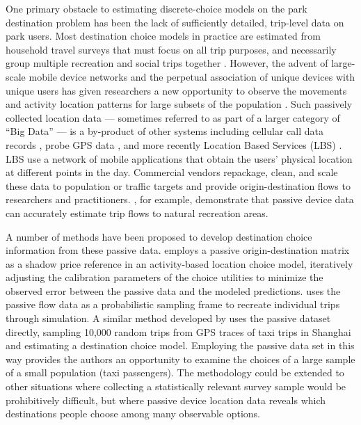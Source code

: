 \documentclass[3p, authoryear, review]{elsarticle} %
\begin{document}
One primary obstacle to estimating discrete-choice models on the park
destination problem has been the lack of sufficiently detailed, trip-level data
on park users. Most destination choice models in practice are estimated from
household travel surveys that must focus on all trip purposes, and necessarily
group multiple recreation and social trips together \citep{nchrp716}. However, the
advent of large-scale mobile device networks and the perpetual association of
unique devices with unique users has given researchers a new opportunity to
observe the movements and activity location patterns for large subsets of the
population \citep{Naboulsi2016}. Such passively collected location data --- sometimes
referred to as part of a larger category of ``Big Data'' --- is a by-product of other
systems including cellular call data records \citep[e.g.,][]{Bolla2000, Calabrese2011}, probe GPS data \citep{Huang2015}, and more recently Location Based
Services (LBS) \citep{Roll2019, Komanduri2017}. LBS use a network of mobile
applications that obtain the users' physical location at different points in the
day. Commercial vendors repackage, clean, and scale these data to population or
traffic targets and provide origin-destination flows to researchers and
practitioners. \citet{Monz2019}, for example, demonstrate that passive device data can
accurately estimate trip flows to natural recreation areas.

A number of methods have been proposed to develop destination choice
information from these passive data. \citet{Bernardin2018} employs a passive
origin-destination matrix as a shadow price reference in an activity-based
location choice model, iteratively adjusting the calibration parameters of the
choice utilities to minimize the observed error between the passive data and the
modeled predictions. \citet{tf_idea} uses the passive flow data as a probabilistic
sampling frame to recreate individual trips through simulation. A similar method
developed by \citet{Zhu2018} uses the passive dataset directly, sampling 10,000 random
trips from GPS traces of taxi trips in Shanghai and estimating a destination
choice model. Employing the passive data set in this way provides the authors an
opportunity to examine the choices of a large sample of a small population (taxi
passengers). The \citet{Zhu2018} methodology could be extended to other situations
where collecting a statistically relevant survey sample would be prohibitively
difficult, but where passive device location data reveals which destinations
people choose among many observable options.
\end{document}
